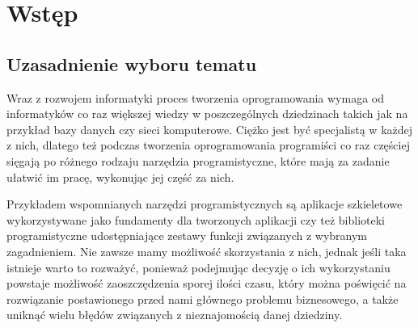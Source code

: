 \documentclass[12pt]{report}
\begin{document}
\lstset{aboveskip=20pt,belowskip=20pt}






\tableofcontents

\chapter{Wstęp} \label{wstep}

\section{Uzasadnienie wyboru tematu}

Wraz z rozwojem informatyki proces tworzenia oprogramowania wymaga od informatyków co raz większej wiedzy w poszczególnych dziedzinach takich jak na przykład bazy 
danych czy sieci komputerowe. Ciężko jest być specjalistą w każdej z nich, dlatego też podczas tworzenia oprogramowania programiści co raz częściej sięgają po różnego 
rodzaju narzędzia programistyczne, które mają za zadanie uła\-twić im pracę, wykonując jej część za nich.

Przykładem wspomnianych narzędzi programistycznych są aplikacje szkieletowe wykorzystywane jako fundamenty dla tworzonych aplikacji czy też biblioteki programistyczne
udostępniające zestawy funkcji związanych z wybranym zagadnieniem. Nie zawsze mamy możliwość skorzystania z nich, jednak jeśli taka istnieje warto to rozważyć,
ponieważ podejmując decyzję o ich wykorzystaniu powstaje możliwość zaoszczędzenia sporej ilości czasu, który można poświęcić na rozwią\-zanie postawionego przed nami
głównego problemu biznesowego, a także uniknąć wielu błędów związanych z nieznajomością danej dziedziny.
\end{document}
